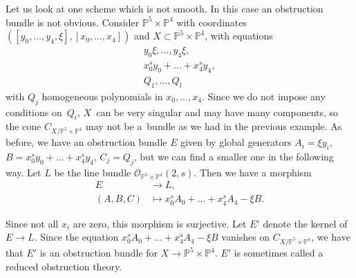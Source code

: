 \documentclass[pdftex]{sigma}
\numberwithin{equation}{section}
\newcommand{\OO}{\mathcal{O}}
\newcommand{\PP}{\mathbb P}
\begin{document}
 \begin{Example}\label{gluecone} Let us look at one scheme which is not smooth. In this case an obstruction bundle is not obvious. Consider $\PP^{5}\times \PP^4$ with coordinates $\left([y_0,\ldots, y_4,\xi],[x_0,\ldots,x_4]\right)$ and $X\subset \PP^5\times\PP^4$, with equations
 \begin{gather*}y_0\xi,\ldots, y_4\xi,\\
 x^s_0y_0+\dots +x^s_4y_4,\\
 Q_1,\ldots,Q_l
 \end{gather*}
 with $Q_j$ homogeneous polynomials in $x_0,\ldots, x_{4}$. Since we do not impose any conditions on~$Q_i$, $X$~can be very singular and may have many components, so the cone $C_{X/\PP^5\times\PP^4}$ may not be a~bundle as we had in the previous example. As before, we have an obstruction bundle $E$ given by global generators $A_i=\xi y_i$, $B=x^s_0y_0+\dots+ x^s_4y_4$, $C_j=Q_j$, but we can find a smaller one in the following way. Let $L$ be the line bundle $\OO_{\PP^5\times\PP^4}(2,s).$ Then we have a morphism
 \begin{align*}
 E&\to L, \\
 (A,B,C)&\mapsto x^s_0A_0+\dots+x^s_4A_4-\xi B.
 \end{align*}

 Since not all $x_i$ are zero, this morphism is surjective. Let $E'$ denote the kernel of $ E\to L$. Since the equation $x^s_0A_0+\dots+x^s_4A_4-\xi B$ vanishes on $C_{X/\PP^5\times\PP^4}$, we have that $E'$ is an obstruction bundle for $X\to \PP^5\times\PP^4$. $E'$ is sometimes called a reduced obstruction theory.
 \end{Example}
\end{document}
